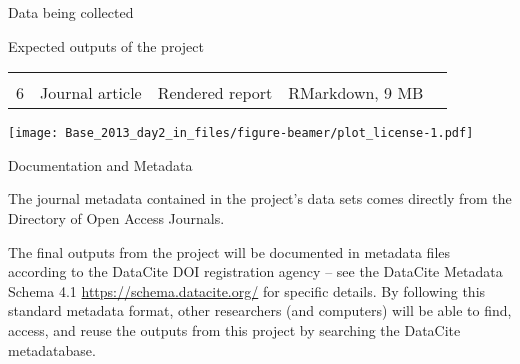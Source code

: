 \documentclass[ignorenonframetext,]{beamer}
\begin{document}
\begin{frame}[fragile]
\begin{block}{Data being collected}
\begin{block}{Expected outputs of the project}
\begin{longtable}[]{@{}cllll@{}}
\begin{minipage}[t]{0.18\columnwidth}
\strut
\end{minipage}\tabularnewline
\begin{minipage}[t]{0.11\columnwidth}\centering\strut
6\strut
\end{minipage} & \begin{minipage}[t]{0.11\columnwidth}\raggedright\strut
Journal article\strut
\end{minipage} & \begin{minipage}[t]{0.16\columnwidth}\raggedright\strut
Rendered report\strut
\end{minipage} & \begin{minipage}[t]{0.14\columnwidth}\raggedright\strut
RMarkdown, 9 MB\strut
\end{minipage} & \begin{minipage}[t]{0.18\columnwidth}\raggedright\strut
\strut
\end{minipage}\tabularnewline
\bottomrule
\end{longtable}

\texttt{[image: Base\_2013\_day2\_in\_files/figure-beamer/plot\_license-1.pdf]}

\end{block}

\end{block}

\end{frame}

\begin{frame}{Documentation and Metadata}

The journal metadata contained in the project's data sets comes directly
from the Directory of Open Access Journals.

The final outputs from the project will be documented in metadata files
according to the DataCite DOI registration agency -- see the DataCite
Metadata Schema 4.1 \url{https://schema.datacite.org/} for specific
details. By following this standard metadata format, other researchers
(and computers) will be able to find, access, and reuse the outputs from
this project by searching the DataCite metadatabase.

\end{frame}
\end{document}
